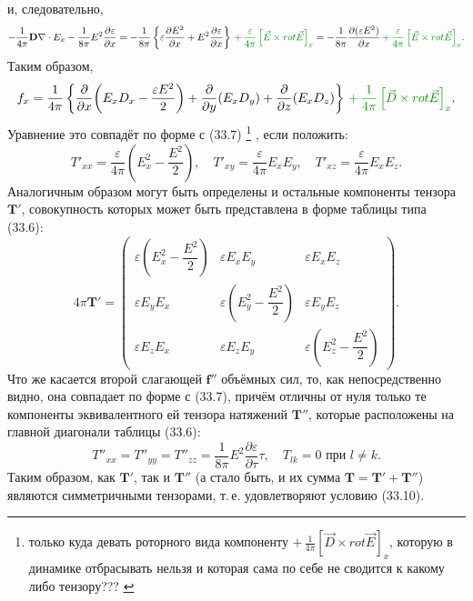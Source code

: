 \documentclass[a4paper,10pt]{article}
\newcommand{\modtext}[1]{\textcolor{modcolor}{#1}}
\newcommand{\modmath}[1]{\textcolor{modcolor}{#1}}
\begin{document}
и, следовательно,
$$
    -\frac{1}{4\pi}\mathbf{D}\nabla\cdot E_x
    - \frac{1}{8\pi}E^2\frac{\partial\varepsilon}{\partial x}
    = -\frac{1}{8\pi}\left\{
        \varepsilon\frac{\partial E^2}{\partial x}
      + E^2\frac{\partial\varepsilon}{\partial x}
    \right\}
    \,\modmath{+ \,\frac{\varepsilon}{4\pi} \left[\vec{E} \times rot \vec{E}\right]_x}
    = -\frac{1}{8\pi}\frac{\partial(\varepsilon E^2)}{\partial x}
    \,\modmath{+ \,\frac{\varepsilon}{4\pi} \left[\vec{E} \times rot \vec{E}\right]_x}.
$$
Таким образом,
$$
    f_x = \frac{1}{4\pi}\left\{
        \frac{\partial}{\partial x}\!\left(E_x D_x - \frac{\varepsilon E^2}{2}\right)
      + \frac{\partial}{\partial y}(E_x D_y)
      + \frac{\partial}{\partial z}(E_x D_z)
    \right\}
    \,\modmath{+ \,\frac{1}{4\pi} \left[\vec{D} \times rot \vec{E}\right]_x}.
$$
Уравнение это совпадёт по форме с (33.7)
\footnote{
\modtext{
только куда девать роторного вида компоненту
$+ \,\frac{1}{4\pi} \left[\vec{D} \times rot \vec{E}\right]_x$, которую в динамике 
отбрасывать нельзя и которая сама по себе не сводится к какому либо тензору???
}
}
, если положить:
$$
    T'_{xx} = \frac{\varepsilon}{4\pi}\!\left(E_x^2 - \frac{E^2}{2}\right),
    \quad
    T'_{xy} = \frac{\varepsilon}{4\pi}E_x E_y,
    \quad
    T'_{xz} = \frac{\varepsilon}{4\pi}E_x E_z.
$$
Аналогичным образом могут быть определены и остальные компоненты
тензора $\mathbf{T}'$, совокупность которых может быть представлена
в форме таблицы типа (33.6):
\begin{equation}
    4\pi\mathbf{T}' =
    \begin{pmatrix}
        \varepsilon\!\left(E_x^2 - \dfrac{E^2}{2}\right)
            & \varepsilon E_x E_y & \varepsilon E_x E_z \\
        \varepsilon E_y E_x
            & \varepsilon\!\left(E_y^2 - \dfrac{E^2}{2}\right)
            & \varepsilon E_y E_z \\
        \varepsilon E_z E_x
            & \varepsilon E_z E_y
            & \varepsilon\!\left(E_z^2 - \dfrac{E^2}{2}\right)
    \end{pmatrix}.
    \tag{34.2}
\end{equation}
Что же касается второй слагающей $\mathbf{f}''$ объёмных сил, то, как
непосредственно видно, она совпадает по форме с (33.7), причём отличны
от нуля только те компоненты эквивалентного ей тензора натяжений
$\mathbf{T}''$, которые расположены на главной диагонали таблицы (33.6):
\begin{equation}
    T''_{xx} = T''_{yy} = T''_{zz}
    = \frac{1}{8\pi}E^2\frac{\partial\varepsilon}{\partial\tau}\tau,
    \quad
    T_{lk} = 0 \text{ при } l \neq k.
    \tag{34.3}
\end{equation}
Таким образом, как $\mathbf{T}'$, так и $\mathbf{T}''$ (а стало быть,
и их сумма $\mathbf{T} = \mathbf{T}' + \mathbf{T}''$) являются
симметричными тензорами, т.\,е. удовлетворяют условию (33.10).
\end{document}
